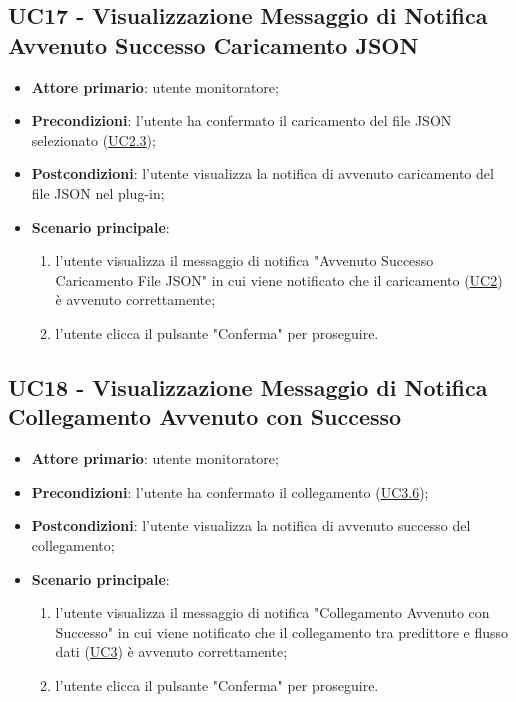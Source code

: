 	
	\label{par:UC17}
	\subsection{UC17 - Visualizzazione Messaggio di Notifica Avvenuto Successo Caricamento JSON}
		\begin{itemize}
			\item\textbf{Attore primario}: utente monitoratore;
			\item\textbf{Precondizioni}: l’utente ha confermato il caricamento del file JSON selezionato  (\hyperref[par:UC2.3]{UC2.3});
			\item\textbf{Postcondizioni}: l’utente visualizza la notifica di avvenuto caricamento del file JSON nel plug-in; 
			\item\textbf{Scenario principale}: 
				\begin{enumerate} 
					\item l’utente visualizza il messaggio di notifica "Avvenuto Successo Caricamento File JSON" in cui viene notificato che il caricamento (\hyperref[par:UC2]{UC2}) è avvenuto correttamente;
					\item l'utente clicca il pulsante "Conferma" per proseguire.		
				\end{enumerate}		
		\end{itemize}

	
	\label{par:UC18}
	\subsection{UC18 - Visualizzazione Messaggio di Notifica Collegamento Avvenuto con Successo}
		\begin{itemize}
			\item\textbf{Attore primario}: utente monitoratore;
			\item\textbf{Precondizioni}: l’utente ha confermato il collegamento (\hyperref[par:UC3.6]{UC3.6});
			\item\textbf{Postcondizioni}: l’utente visualizza la notifica di avvenuto successo del collegamento; 
			\item\textbf{Scenario principale}: 
				\begin{enumerate} 
					\item l’utente visualizza il messaggio di notifica "Collegamento Avvenuto con Successo" in cui viene notificato che il collegamento tra predittore e flusso dati (\hyperref[par:UC3]{UC3}) è avvenuto correttamente;
					\item l'utente clicca il pulsante "Conferma" per proseguire.		
				\end{enumerate}		
		\end{itemize}
	

